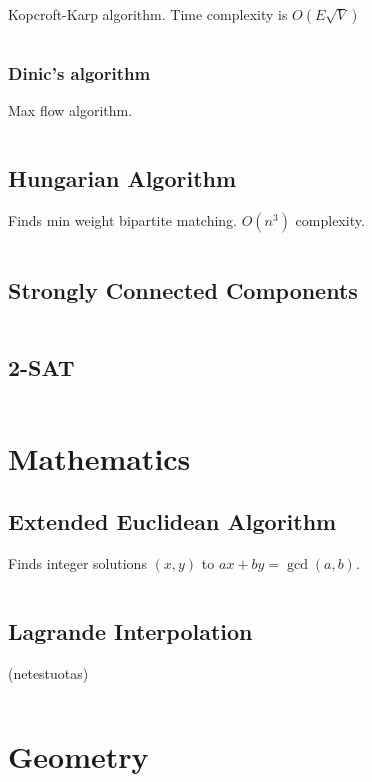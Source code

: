 \documentclass[8pt,a4paper,landscape,oneside]{amsart}
\newcommand{\code}[1]{\inputminted[fontsize=\normalsize,baselinestretch=1]{cpp}{_code/#1}}
\begin{document}
\begin{multicols*}{3}
	Kopcroft-Karp algorithm. Time complexity is $O(E\sqrt{V})$
	
	\code{graphs/bipartite_matching.cpp}
	
	\subsubsection{Dinic's algorithm}
	
	Max flow algorithm.
	
	\code{graphs/dinic.cpp}
	
	\subsection{Hungarian Algorithm}
	
	Finds min weight bipartite matching. $O(n^3)$ complexity.
	
	\code{graphs/hungarian_algorithm.cpp}
	
	\subsection{Strongly Connected Components}
	
	\code{graphs/strongly_connected_components.cpp}
	
	\subsection{2-SAT}
	
	\code{graphs/2sat.cpp}

\section{Mathematics}

	\subsection{Extended Euclidean Algorithm}
	
	Finds integer solutions $(x, y)$ to $ax + by = \gcd(a, b)$.
	
	\code{math/extended_euclidean_algorithm.cpp}
	
	\subsection{Lagrande Interpolation} (netestuotas)
	
	\code{math/lagrande_interpolation.cpp}
	
\section{Geometry}


\end{multicols*}
\end{document}
